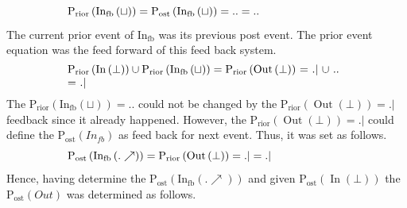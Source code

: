 \documentclass[10pt,journal]{IEEEtran}
\begin{document}
\begin{equation}
 \begin{minipage}{250pt}
\begin{flushleft} $\displaystyle \operatorname{P_{rior}}{\left(\operatorname{In_{fb}}{\left(\sqcup \right)} \right)} = \operatorname{P_{ost}}{\left(\operatorname{In_{fb}}{\left(\sqcup \right)} \right)} = .. = ..$  \end{flushleft}
 \end{minipage}
 \end{equation}
The current prior event of $\operatorname{In_{fb}}$ was its previous post event. The     prior event equation was the feed forward of this feed back system.
\begin{equation}
 \begin{minipage}{250pt}
\begin{flushleft} $\displaystyle \operatorname{P_{rior}}{\left(\operatorname{In}{\left(\bot \right)} \right)}  \cup  \operatorname{P_{rior}}{\left(\operatorname{In_{fb}}{\left(\sqcup \right)} \right)} = \operatorname{P_{rior}}{\left(\operatorname{Out}{\left(\bot \right)} \right)}$   = $.|$ $\cup$ $..$ = $.|$\end{flushleft}
 \end{minipage}
 \end{equation}
The $\operatorname{P_{rior}}{\left(\operatorname{In_{fb}}{\left(\sqcup \right)} \right)} = ..$ could not be changed by the $\operatorname{P_{rior}}{\left(\operatorname{Out}{\left(\bot \right)} \right)} = .|$ feedback since it already happened.     However, the $\operatorname{P_{rior}}{\left(\operatorname{Out}{\left(\bot \right)} \right)} = .|$ could define     the $\operatorname{P_{ost}}{\left(In_{fb} \right)}$ as feed back for next event. Thus, it was     set as follows.
\begin{equation}
 \begin{minipage}{250pt}
\begin{flushleft} $\displaystyle \operatorname{P_{ost}}{\left(\operatorname{In_{fb}}{\left(.\nearrow \right)} \right)} = \operatorname{P_{rior}}{\left(\operatorname{Out}{\left(\bot \right)} \right)} = .| = .|$  \end{flushleft}
 \end{minipage}
 \end{equation}
Hence, having determine the $\operatorname{P_{ost}}{\left(\operatorname{In_{fb}}{\left(.\nearrow \right)} \right)}$ and given $\operatorname{P_{ost}}{\left(\operatorname{In}{\left(\bot \right)} \right)}$ the $\operatorname{P_{ost}}{\left(Out \right)}$ was determined as follows.
\end{document}

